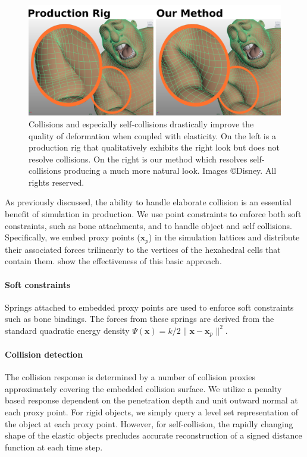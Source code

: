 

\begin{figure}
\begin{center}
\includegraphics[width=\linewidth]{elasticity/figures/collision-figure}
\end{center}
\caption[Collisions improve deformation quality.]{Collisions and especially self-collisions drastically improve the
  quality of deformation when coupled with elasticity. On the left is a
  production rig that qualitatively exhibits the right look but does not resolve
  collisions. On the right is our method which resolves self-collisions
  producing a much more natural look. Images \copyright Disney. All rights reserved.}
\label{fig:collisions}
\end{figure}

As previously discussed, the ability to handle elaborate collision is an essential benefit of simulation in production. We use point constraints to enforce both soft constraints, such as bone attachments, and to handle object and self collisions. Specifically, we embed proxy points ($\mathbf{x}_p$) in the simulation lattices and distribute their associated forces trilinearly to the vertices of the hexahedral cells that contain them. \cite{sifakis:2007:hybridsolids} show the effectiveness of this basic approach.

\paragraph{Soft constraints }
Springs attached to embedded proxy points are used to enforce soft constraints such as bone bindings. The forces from these springs are derived from the standard quadratic energy density
$\Psi(\mathbf{x}) = k/2\|\mathbf{x}-\mathbf{x}_p\|^2$.

\paragraph{Collision detection }
The collision response is determined by a number of collision proxies approximately covering the embedded collision surface. We utilize a penalty based response dependent on the penetration depth and unit outward normal at each proxy point. For rigid objects, we simply query a level set representation of the object at each proxy point. However, for self-collision, the rapidly changing shape of the elastic objects precludes accurate reconstruction of a signed distance function at each time step.

